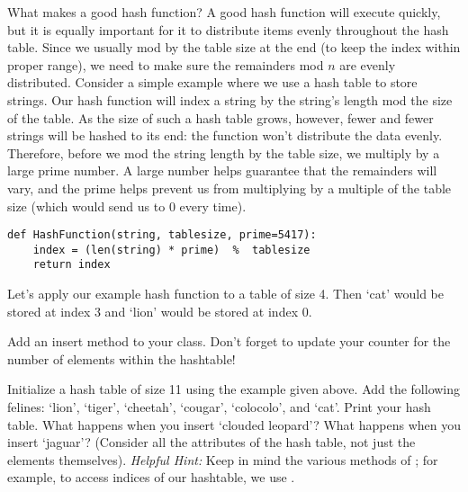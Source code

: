 What makes a good hash function?
A good hash function will execute quickly, but it is equally important for it to distribute items evenly throughout the hash table. 
Since we usually mod by the table size at the end (to keep the index within proper range), we need to make sure the remainders mod $n$ are evenly distributed.
Consider a simple example where we use a hash table to store strings.
Our hash function will index a string by the string's length mod the size of the table.
As the size of such a hash table grows, however, fewer and fewer strings will be hashed to its end: the function won't distribute the data evenly.
Therefore, before we mod the string length by the table size, we multiply by a large prime number.
A large number helps guarantee that the remainders will vary, and the prime helps prevent us from multiplying by a multiple of the table size (which would send us to $0$ every time).
\begin{lstlisting}
def HashFunction(string, tablesize, prime=5417):
    index = (len(string) * prime)  %  tablesize
    return index
\end{lstlisting}
Let's apply our example hash function to a table of size 4.
Then `cat' would be stored at index $3$ and `lion' would be stored at index $0$.
\begin{figure}
\end{figure}
\begin{problem}
Add an insert method to your  class. Don't forget to update your counter for the number of elements within the hashtable!

Initialize a hash table of size 11 using the example  given above.
Add the following felines: `lion', `tiger', `cheetah', `cougar', `colocolo', and `cat'.
Print your hash table. What happens when you insert `clouded leopard'?
What happens when you insert `jaguar'? (Consider all the attributes of the hash table, not just the elements themselves).
\emph{Helpful Hint:} Keep in mind the various methods of ; for example, to access indices of our hashtable, we use .
\label{Prob:Basic hash insert}
\end{problem}

